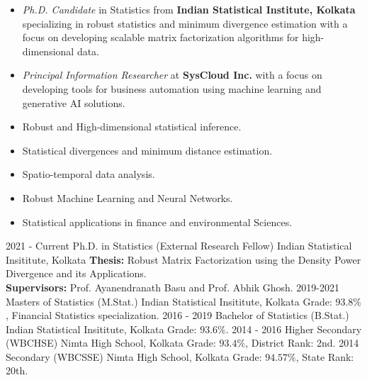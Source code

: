 \documentclass[10pt]{developercv} %
\begin{document}
\begin{itemize}[noitemsep, leftmargin=*]
    \item \emph{Ph.D. Candidate} in Statistics from \textbf{Indian Statistical Institute, Kolkata} specializing in robust statistics and minimum divergence estimation with a focus on developing scalable matrix factorization algorithms for high-dimensional data.
    \item \emph{Principal Information Researcher} at \textbf{SysCloud Inc.} with a focus on developing tools for business automation using machine learning and generative AI solutions.
\end{itemize}

\vspace{-12pt}

\begin{itemize}[noitemsep, leftmargin=*]
    \item Robust and High-dimensional statistical inference.
    \item Statistical divergences and minimum distance estimation.
    \item Spatio-temporal data analysis.
    \item Robust Machine Learning and Neural Networks.
    \item Statistical applications in finance and environmental Sciences.
\end{itemize}

\begin{entrylist}
    \entry
    {2021 - Current}
    {Ph.D. in Statistics (External Research Fellow)}
    {Indian Statistical Insititute, Kolkata}
    {\textbf{Thesis:} Robust Matrix Factorization using the Density Power Divergence and its Applications. \\
    \textbf{Supervisors:} Prof. Ayanendranath Basu and Prof. Abhik Ghosh.}
    \entry
    {2019-2021}
    {Masters of Statistics (M.Stat.)}
    {Indian Statistical Insititute, Kolkata}
    {Grade: $93.8\%$, Financial Statistics specialization.}
    \entry
    {2016 - 2019}
    {Bachelor of Statistics (B.Stat.)}
    {Indian Statistical Insititute, Kolkata}
    {Grade: $93.6\%$.}
    \entry
    {2014 - 2016}
    {Higher Secondary (WBCHSE)}
    {Nimta High School, Kolkata}
    {Grade: $93.4\%$, District Rank: 2nd.}
    \entry
    {2014}
    {Secondary (WBCSSE)}
    {Nimta High School, Kolkata}
    {Grade: $94.57\%$, State Rank: 20th.}
\end{entrylist}
\end{document}
